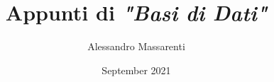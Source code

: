 \documentclass[a4paper, 11pt]{report}
\title{Appunti di \textit{"Basi di Dati"}}
\author{Alessandro Massarenti}
\date{September 2021}
\begin{document}
\maketitle

\tableofcontents









\lstlistoflistings
\end{document}
